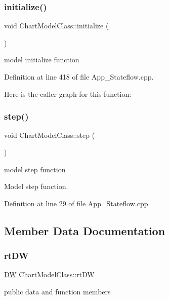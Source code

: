 \subsubsection{\texorpdfstring{initialize()}{initialize()}}
{\footnotesize\ttfamily void Chart\+Model\+Class\+::initialize (\begin{DoxyParamCaption}{ }\end{DoxyParamCaption})}



model initialize function 



Definition at line 418 of file App\+\_\+\+Stateflow.\+cpp.

Here is the caller graph for this function\+:
\mbox{\label{class_chart_model_class_ab729e721b38bcedeed5b39c2de387413}} 
\subsubsection{\texorpdfstring{step()}{step()}}
{\footnotesize\ttfamily void Chart\+Model\+Class\+::step (\begin{DoxyParamCaption}{ }\end{DoxyParamCaption})}



model step function 

Model step function. 

Definition at line 29 of file App\+\_\+\+Stateflow.\+cpp.



\subsection{Member Data Documentation}
\mbox{\label{class_chart_model_class_a1c2dcf4c77e74c040501b76bd18eebf8}} 
\subsubsection{\texorpdfstring{rtDW}{rtDW}}
{\footnotesize\ttfamily \mbox{\hyperlink{struct_d_w}{DW}} Chart\+Model\+Class\+::rt\+DW}



public data and function members 

